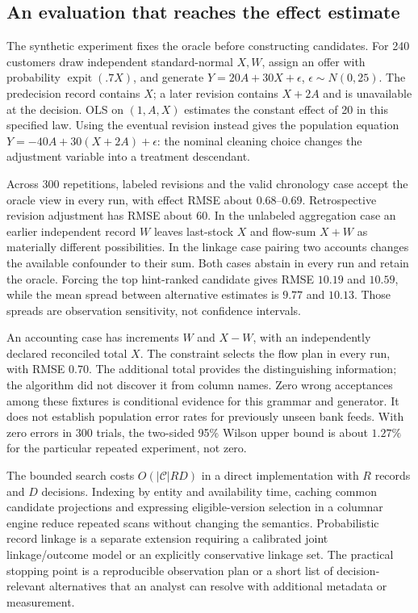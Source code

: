 \subsection{An evaluation that reaches the effect estimate}
The synthetic experiment fixes the oracle before constructing candidates.
For 240 customers draw independent standard-normal $X,W$, assign an offer
with probability $\operatorname{expit}(.7X)$, and generate
$Y=20A+30X+\epsilon$, $\epsilon\sim N(0,25)$. The predecision record
contains $X$; a later revision contains $X+2A$ and is unavailable at the
decision. OLS on $(1,A,X)$ estimates the constant effect of 20 in this
specified law. Using the eventual revision instead gives the population
equation $Y=-40A+30(X+2A)+\epsilon$: the nominal cleaning choice changes
the adjustment variable into a treatment descendant.

Across 300 repetitions, labeled revisions and the valid chronology case
accept the oracle view in every run, with effect RMSE about $0.68$--$0.69$.
Retrospective revision adjustment has RMSE about $60$. In the unlabeled
aggregation case an earlier independent record $W$ leaves last-stock $X$
and flow-sum $X+W$ as materially different possibilities. In the linkage
case pairing two accounts changes the available confounder to their sum.
Both cases abstain in every run and retain the oracle. Forcing the top
hint-ranked candidate gives RMSE $10.19$ and $10.59$, while the mean
spread between alternative estimates is $9.77$ and $10.13$. Those spreads
are observation sensitivity, not confidence intervals.

An accounting case has increments $W$ and $X-W$, with an independently
declared reconciled total $X$. The constraint selects the flow plan in every
run, with RMSE $0.70$. The additional total provides the distinguishing
information; the algorithm did not discover it from column names.
Zero wrong acceptances among these fixtures is conditional evidence for
this grammar and generator. It does not establish population error rates
for previously unseen bank feeds. With zero errors in 300 trials, the
two-sided 95\% Wilson upper bound is about $1.27\%$ for the particular
repeated experiment, not zero.

The bounded search costs $O(|\mathcal C|RD)$ in a direct implementation
with $R$ records and $D$ decisions. Indexing by entity and availability
time, caching common candidate projections and expressing eligible-version
selection in a columnar engine reduce repeated scans without changing the
semantics. Probabilistic record linkage is a separate extension requiring
a calibrated joint linkage/outcome model or an explicitly conservative
linkage set. The practical stopping point is a reproducible observation
plan or a short list of decision-relevant alternatives that an analyst can
resolve with additional metadata or measurement.


